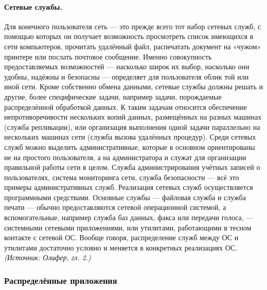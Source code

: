 \documentclass[a4paper,12pt]{article}
\begin{document}
\paragraph{Сетевые службы.}
Для конечного пользователя сеть — это прежде всего тот набор сетевых служб, с помощью которых он получает возможность просмотреть список имеющихся в сети компьютеров, прочитать удалённый файл, распечатать документ на «чужом» принтере или послать почтовое сообщение. Именно совокупность предоставляемых возможностей — насколько широк их выбор, насколько они удобны, надёжны и безопасны — определяет для пользователя облик той или иной сети. Кроме собственно обмена данными, сетевые службы должны решать и другие, более специфические задачи, например задачи, порождаемые распределённой обработкой данных. К таким задачам относится обеспечение непротиворечивости нескольких копий данных, размещённых на разных машинах (служба репликации), или организация выполнения одной задачи параллельно на нескольких машинах сети (служба вызова удалённых процедур). Среди сетевых служб можно выделить административные, которые в основном ориентированы не на простого пользователя, а на администратора и служат для организации правильной работы сети в целом. Служба администрирования учётных записей о пользователях, система мониторинга сети, служба безопасности — всё это примеры административных служб. Реализация сетевых служб осуществляется программными средствами. Основные службы — файловая служба и служба печати — обычно предоставляются сетевой операционной системой, а вспомогательные, например служба баз данных, факса или передачи голоса, — системными сетевыми приложениями, или утилитами, работающими в тесном контакте с сетевой ОС. Вообще говоря, распределение служб между ОС и утилитами достаточно условно и меняется в конкретных реализациях ОС.
\textit{(Источник: Олифер, гл. 2.)}

\subsubsection{Распределённые приложения}
\end{document}
